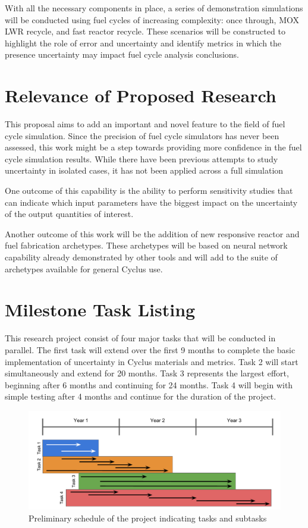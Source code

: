 \documentclass[dvips,12pt]{article}
\begin{document}
With all the necessary components in place, a
series of demonstration simulations will be
conducted using fuel cycles of increasing
complexity: once through, MOX LWR recycle, and
fast reactor recycle.  These scenarios will be
constructed to highlight the role of error and
uncertainty and identify metrics in which the
presence uncertainty may impact fuel cycle
analysis conclusions.

\section{Relevance of Proposed Research}

This proposal aims to add an important and novel
feature to the field of fuel cycle simulation.
Since the precision of fuel cycle simulators has
never been assessed, this work might be a step
towards providing more confidence in the fuel
cycle simulation results.  While there have been
previous attempts to study uncertainty in isolated
cases\cite{visionEcon}, it has not been applied
across a full simulation

One outcome of this capability is the ability to
perform sensitivity studies that can indicate
which input parameters have the biggest impact on
the uncertainty of the output quantities of
interest.

Another outcome of this work will be the addition
of new responsive reactor and fuel fabrication
archetypes.  These archetypes will be based on
neural network capability already demonstrated by
other tools and will add to the suite of
archetypes available for general Cyclus use.

\section{Milestone Task Listing}

This research project consist of four major tasks
that will be conducted in parallel.  The first
task will extend over the first 9 months to
complete the basic implementation of uncertainty
in Cyclus materials and metrics.  Task 2 will
start simultaneously and extend for 20 months.
Task 3 represents the largest effort, beginning
after 6 months and continuing for 24 months.  Task
4 will begin with simple testing after 4 months
and continue for the duration of the project.

\begin{figure}[h!]
\centering
\includegraphics[width=\textwidth]	{timeline}
\caption{Preliminary schedule of the project indicating tasks and subtasks}
\label{fig:progression}
\end{figure}
\end{document}
